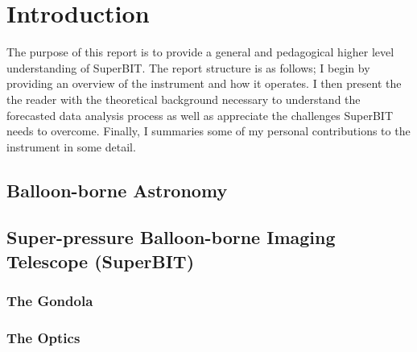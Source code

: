 \chapter{Introduction}

The purpose of this report is to provide a general and pedagogical higher level understanding of SuperBIT. The report structure is as follows; I begin by providing an overview of the instrument and how it operates. I then present the the reader with the theoretical background necessary to understand the forecasted data analysis process as well as appreciate the challenges SuperBIT needs to overcome. Finally, I summaries some of my personal contributions to the instrument in some detail.
  

\section{Balloon-borne Astronomy}

\section{Super-pressure Balloon-borne Imaging Telescope (SuperBIT)}
\subsection{The Gondola}

\subsection{The Optics}

